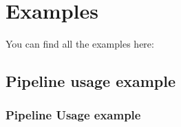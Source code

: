 \documentclass[letterpaper,10pt,english]{sphinxmanual}
\begin{document}
\section{Examples}
\label{\detokenize{examples:examples}}\label{\detokenize{examples::doc}}
You can find all the examples here:


\subsection{Pipeline usage example}
\label{\detokenize{examples:pipeline-usage-example}}

\subsubsection{Pipeline Usage example}
\label{\detokenize{pipeline_example:pipeline-usage-example}}\label{\detokenize{pipeline_example::doc}}
\end{document}
